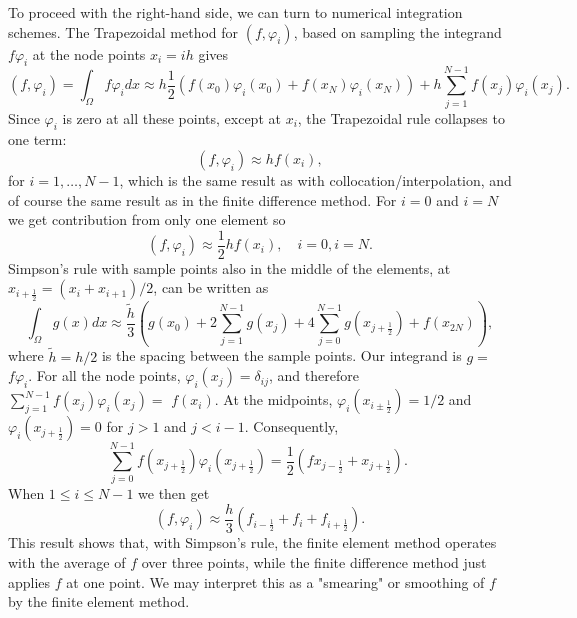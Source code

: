 \documentclass[../main.tex]{subfiles}
\begin{document}
	To proceed with the right-hand side, we can turn to numerical integration schemes. The Trapezoidal method for $\left(f, \varphi_{i}\right)$, based on sampling the integrand $f \varphi_{i}$ at the node points $x_{i}=i h$ gives
	$$
	\left(f, \varphi_{i}\right)=\int_{\Omega} f \varphi_{i} d x \approx h \frac{1}{2}\left(f\left(x_{0}\right) \varphi_{i}\left(x_{0}\right)+f\left(x_{N}\right) \varphi_{i}\left(x_{N}\right)\right)+h \sum_{j=1}^{N-1} f\left(x_{j}\right) \varphi_{i}\left(x_{j}\right) .
	$$
	Since $\varphi_{i}$ is zero at all these points, except at $x_{i}$, the Trapezoidal rule collapses to one term:
	\begin{equation}\label{eqa86}
		\left(f, \varphi_{i}\right) \approx h f\left(x_{i}\right),
	\end{equation}
	for $i=1, \ldots, N-1$, which is the same result as with collocation/interpolation, and of course the same result as in the finite difference method. For $i=0$ and $i=N$ we get contribution from only one element so
	\begin{equation}\label{eqa87}
		\left(f, \varphi_{i}\right) \approx \frac{1}{2} h f\left(x_{i}\right), \quad i=0, i=N .
	\end{equation}
	Simpson's rule with sample points also in the middle of the elements, at $x_{i+\frac{1}{2}}=\left(x_{i}+x_{i+1}\right) / 2$, can be written as
	$$
	\int_{\Omega} g(x) d x \approx \frac{\tilde{h}}{3}\left(g\left(x_{0}\right)+2 \sum_{j=1}^{N-1} g\left(x_{j}\right)+4 \sum_{j=0}^{N-1} g\left(x_{j+\frac{1}{2}}\right)+f\left(x_{2 N}\right)\right),
	$$
	where $\tilde{h}=h / 2$ is the spacing between the sample points. Our integrand is $g=$ $f \varphi_{i}$. For all the node points, $\varphi_{i}\left(x_{j}\right)=\delta_{i j}$, and therefore $\sum_{j=1}^{N-1} f\left(x_{j}\right) \varphi_{i}\left(x_{j}\right)=$ $f\left(x_{i}\right)$. At the midpoints, $\varphi_{i}\left(x_{i \pm \frac{1}{2}}\right)=1 / 2$ and $\varphi_{i}\left(x_{j+\frac{1}{2}}\right)=0$ for $j>1$ and $j<i-1$. Consequently,
	$$
	\sum_{j=0}^{N-1} f\left(x_{j+\frac{1}{2}}\right) \varphi_{i}\left(x_{j+\frac{1}{2}}\right)=\frac{1}{2}\left(f x_{j-\frac{1}{2}}+x_{j+\frac{1}{2}}\right) \text {. }
	$$
	When $1 \leq i \leq N-1$ we then get
	\begin{equation}\label{eqa88}
		\left(f, \varphi_{i}\right) \approx \frac{h}{3}\left(f_{i-\frac{1}{2}}+f_{i}+f_{i+\frac{1}{2}}\right) .
	\end{equation}
	This result shows that, with Simpson's rule, the finite element method operates with the average of $f$ over three points, while the finite difference method just applies $f$ at one point. We may interpret this as a "smearing" or smoothing of $f$ by the finite element method.
	
\end{document}
